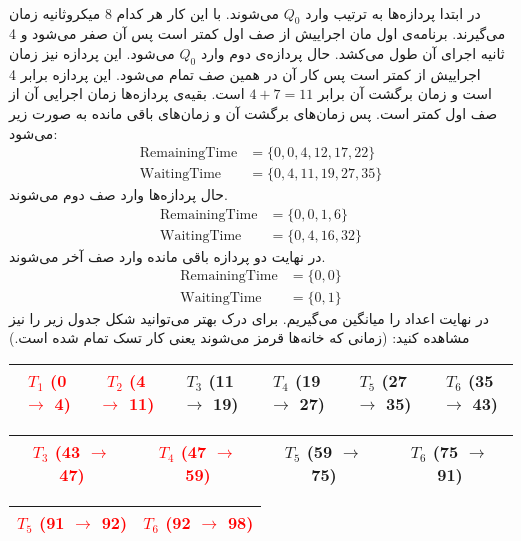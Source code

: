 \\
در ابتدا پردازه‌ها به ترتیب وارد
$Q_0$
می‌شوند. با این کار هر کدام 8 میکروثانیه زمان می‌گیرند.
برنامه‌ی اول مان اجراییش از
صف اول کمتر است پس
آن صفر می‌شود و 4 ثانیه اجرای آن طول می‌کشد.
حال پردازه‌ی دوم وارد
$Q_0$
می‌شود. این پردازه نیز زمان اجراییش از
کمتر است پس کار آن در همین صف تمام می‌شود.
این پردازه برابر 4 است و زمان برگشت آن برابر
$4 + 7 = 11$
است. بقیه‌ی پردازه‌ها زمان اجرایی آن از
صف اول کمتر است. پس زمان‌های برگشت آن و زمان‌های باقی مانده به صورت زیر می‌شود:
\begin{align*}
    \text{RemainingTime} &= \{0, 0, 4, 12, 17, 22\}\\
    \text{WaitingTime} &= \{0, 4, 11, 19, 27, 35\} %
\end{align*}
حال پردازه‌ها وارد صف دوم می‌شوند. 
\begin{align*}
    \text{RemainingTime} &= \{0, 0, 1, 6\}\\
    \text{WaitingTime} &= \{0, 4, 16, 32\} %
\end{align*}
در نهایت دو پردازه باقی مانده وارد صف آخر می‌شوند.
\begin{align*}
    \text{RemainingTime} &= \{0, 0\}\\
    \text{WaitingTime} &= \{0, 1\}
\end{align*}
در نهایت اعداد را میانگین می‌گیریم.
برای درک بهتر می‌توانید شکل جدول زیر را نیز مشاهده کنید:
(زمانی که خانه‌ها قرمز می‌شوند یعنی کار تسک تمام شده است.)
\begin{latin}
\begin{center}
\begin{tabular}{|c|c|c|c|c|c|}
    \hline
    \textcolor{red}{$T_1$ (0 $\rightarrow$ 4)} & \textcolor{red}{$T_2$ (4 $\rightarrow$ 11)} & $T_3$ (11 $\rightarrow$ 19) & $T_4$ (19 $\rightarrow$ 27) & $T_5$ (27 $\rightarrow$ 35) & $T_6$ (35 $\rightarrow$ 43) \\
    \hline
\end{tabular}
\linebreak
\begin{tabular}{|c|c|c|c|}
    \hline
    \textcolor{red}{$T_3$ (43 $\rightarrow$ 47)} & \textcolor{red}{$T_4$ (47 $\rightarrow$ 59)} & $T_5$ (59 $\rightarrow$ 75) & $T_6$ (75 $\rightarrow$ 91) \\
    \hline
\end{tabular}
\linebreak
\begin{tabular}{|c|c|}
    \hline
    \textcolor{red}{$T_5$ (91 $\rightarrow$ 92)} & \textcolor{red}{$T_6$ (92 $\rightarrow$ 98)} \\
    \hline
\end{tabular}
\end{center}
\end{latin}
